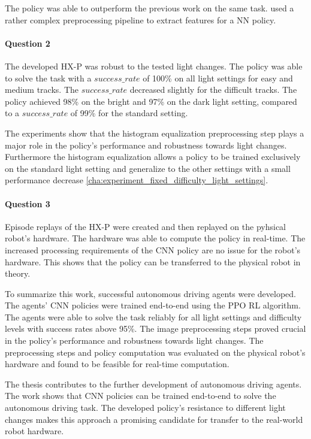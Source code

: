 The policy was able to outperform the previous work on the same task. \textcite{maximilian} used a rather complex preprocessing pipeline to extract features for a \ac{NN} policy.

\paragraph{Question 2}
The developed \ac{HX-P} was robust to the tested light changes. The policy was able to solve the task with a $success\_rate$ of 100\% on all light settings for easy and medium tracks. The $success\_rate$ decreased slightly for the difficult tracks. The policy achieved 98\% on the bright and 97\% on the dark light setting, compared to a $success\_rate$ of 99\% for the standard setting.

The experiments show that the histogram equalization preprocessing step plays a major role in the policy's performance and robustness towards light changes. Furthermore the histogram equalization allows a policy to be trained exclusively on the standard light setting and generalize to the other settings with a small performance decrease \ref{cha:experiment_fixed_difficulty_light_settings}.

\paragraph{Question 3}
Episode replays of the \ac{HX-P} were created and then replayed on the pyhsical robot's hardware. The hardware was able to compute the policy in real-time. The increased processing requirements of the \ac{CNN} policy are no issue for the robot's hardware. This shows that the policy can be transferred to the physical robot in theory.


To summarize this work, successful autonomous driving agents were developed. The agents' \ac{CNN} policies were trained end-to-end using the \ac{PPO} \ac{RL} algorithm. The agents were able to solve the task reliably for all light settings and difficulty levels with success rates above 95\%. The image preprocessing steps proved crucial in the policy's performance and robustness towards light changes. The preprocessing steps and policy computation was evaluated on the physical robot's hardware and found to be feasible for real-time computation.

The thesis contributes to the further development of autonomous driving agents. The work shows that \ac{CNN} policies can be trained end-to-end to solve the autonomous driving task. The developed policy's resistance to different light changes makes this approach a promising candidate for transfer to the real-world robot hardware.

